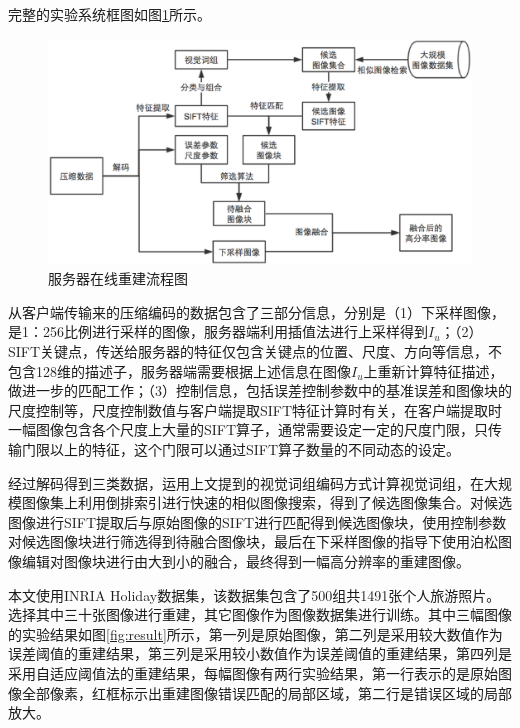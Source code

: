 \documentclass[UTF8]{csoarticle}
\begin{document}
完整的实验系统框图如图\ref{fig:serverOnline}所示。
\begin{figure}
\centering\includegraphics[width=15cm]{serverOnline}
\caption{服务器在线重建流程图}
\label{fig:serverOnline}
\end{figure}
从客户端传输来的压缩编码的数据包含了三部分信息，分别是（1）下采样图像，是1：256比例进行采样的图像，服务器端利用插值法进行上采样得到\(I_u\)；（2）SIFT关键点，传送给服务器的特征仅包含关键点的位置、尺度、方向等信息，不包含128维的描述子，服务器端需要根据上述信息在图像\(I_u\)上重新计算特征描述，做进一步的匹配工作；（3）控制信息，包括误差控制参数中的基准误差和图像块的尺度控制等，尺度控制数值与客户端提取SIFT特征计算时有关，在客户端提取时一幅图像包含各个尺度上大量的SIFT算子，通常需要设定一定的尺度门限，只传输门限以上的特征，这个门限可以通过SIFT算子数量的不同动态的设定。

经过解码得到三类数据，运用上文提到的视觉词组编码方式计算视觉词组，在大规模图像集上利用倒排索引进行快速的相似图像搜索，得到了候选图像集合。对候选图像进行SIFT提取后与原始图像的SIFT进行匹配得到候选图像块，使用控制参数对候选图像块进行筛选得到待融合图像块，最后在下采样图像的指导下使用泊松图像编辑对图像块进行由大到小的融合，最终得到一幅高分辨率的重建图像。

本文使用INRIA Holiday数据集，该数据集包含了500组共1491张个人旅游照片。选择其中三十张图像进行重建，其它图像作为图像数据集进行训练。其中三幅图像的实验结果如图\ref{fig:result}所示，第一列是原始图像，第二列是采用较大数值作为误差阈值的重建结果，第三列是采用较小数值作为误差阈值的重建结果，第四列是采用自适应阈值法的重建结果，每幅图像有两行实验结果，第一行表示的是原始图像全部像素，红框标示出重建图像错误匹配的局部区域，第二行是错误区域的局部放大。
\end{document}
